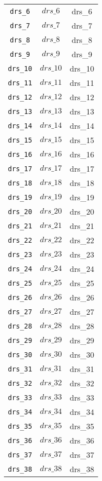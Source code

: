 \begin{center}
\begin{longtable}{ccc}
\texttt{drs\_6} & $drs\_6$ & drs\_6\\
\texttt{drs\_7} & $drs\_7$ & drs\_7\\
\texttt{drs\_8} & $drs\_8$ & drs\_8\\
\texttt{drs\_9} & $drs\_9$ & drs\_9\\
\texttt{drs\_10} & $drs\_10$ & drs\_10\\
\texttt{drs\_11} & $drs\_11$ & drs\_11\\
\texttt{drs\_12} & $drs\_12$ & drs\_12\\
\texttt{drs\_13} & $drs\_13$ & drs\_13\\
\texttt{drs\_14} & $drs\_14$ & drs\_14\\
\texttt{drs\_15} & $drs\_15$ & drs\_15\\
\texttt{drs\_16} & $drs\_16$ & drs\_16\\
\texttt{drs\_17} & $drs\_17$ & drs\_17\\
\texttt{drs\_18} & $drs\_18$ & drs\_18\\
\texttt{drs\_19} & $drs\_19$ & drs\_19\\
\texttt{drs\_20} & $drs\_20$ & drs\_20\\
\texttt{drs\_21} & $drs\_21$ & drs\_21\\
\texttt{drs\_22} & $drs\_22$ & drs\_22\\
\texttt{drs\_23} & $drs\_23$ & drs\_23\\
\texttt{drs\_24} & $drs\_24$ & drs\_24\\
\texttt{drs\_25} & $drs\_25$ & drs\_25\\
\texttt{drs\_26} & $drs\_26$ & drs\_26\\
\texttt{drs\_27} & $drs\_27$ & drs\_27\\
\texttt{drs\_28} & $drs\_28$ & drs\_28\\
\texttt{drs\_29} & $drs\_29$ & drs\_29\\
\texttt{drs\_30} & $drs\_30$ & drs\_30\\
\texttt{drs\_31} & $drs\_31$ & drs\_31\\
\texttt{drs\_32} & $drs\_32$ & drs\_32\\
\texttt{drs\_33} & $drs\_33$ & drs\_33\\
\texttt{drs\_34} & $drs\_34$ & drs\_34\\
\texttt{drs\_35} & $drs\_35$ & drs\_35\\
\texttt{drs\_36} & $drs\_36$ & drs\_36\\
\texttt{drs\_37} & $drs\_37$ & drs\_37\\
\texttt{drs\_38} & $drs\_38$ & drs\_38\\

\end{longtable}
\end{center}

